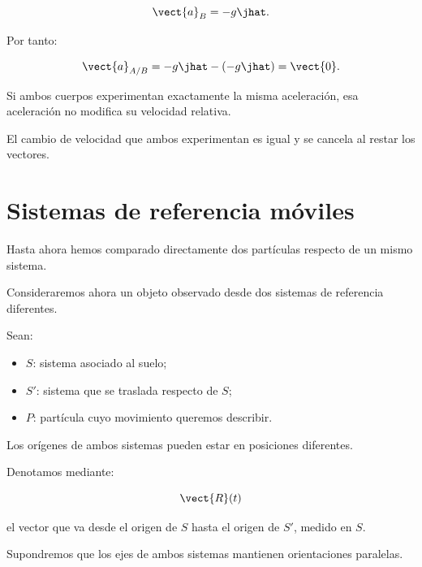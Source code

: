 \[
\vect{a}_B=-g\jhat.
\]

Por tanto:

\[
\vect{a}_{A/B}
=
-g\jhat-(-g\jhat)
=
\vect{0}.
\]

\begin{interpretacion}

Si ambos cuerpos experimentan exactamente la misma
aceleración, esa aceleración no modifica su velocidad
relativa.

El cambio de velocidad que ambos experimentan
es igual y se cancela al restar los vectores.

\end{interpretacion}


\section{Sistemas de referencia móviles}

Hasta ahora hemos comparado directamente dos partículas
respecto de un mismo sistema.

Consideraremos ahora un objeto observado desde dos sistemas
de referencia diferentes.

Sean:

\begin{itemize}
    \item \(S\): sistema asociado al suelo;
    \item \(S'\): sistema que se traslada respecto de \(S\);
    \item \(P\): partícula cuyo movimiento queremos describir.
\end{itemize}

Los orígenes de ambos sistemas pueden estar en posiciones
diferentes.

Denotamos mediante:

\[
\vect{R}(t)
\]

el vector que va desde el origen de \(S\) hasta el origen
de \(S'\), medido en \(S\).

Supondremos que los ejes de ambos sistemas mantienen
orientaciones paralelas.

